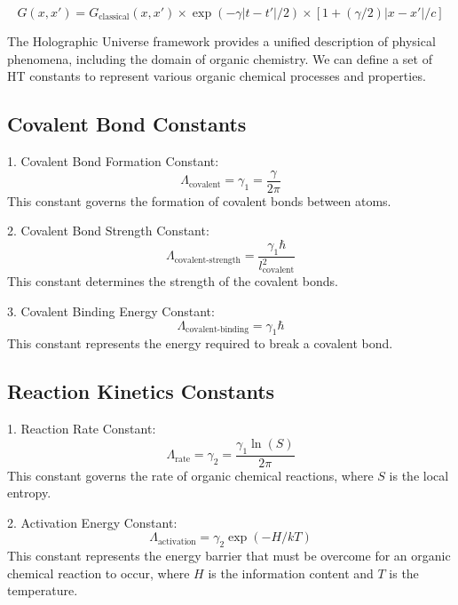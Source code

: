 \documentclass{article}
\theoremstyle{plain}
\theoremstyle{definition}
\theoremstyle{remark}
\begin{document}
\begin{equation}
G(x,x') = G_\text{classical}(x,x') \times \exp(-\gamma|t-t'|/2) \times \left[1 + (\gamma/2)|x-x'|/c\right]
\end{equation}

The Holographic Universe framework provides a unified description of physical phenomena, including the domain of organic chemistry. We can define a set of HT constants to represent various organic chemical processes and properties.

\subsection{Covalent Bond Constants}

1. Covalent Bond Formation Constant:
   \begin{equation}
   \Lambda_\text{covalent} = \gamma_1 = \frac{\gamma}{2\pi}
   \end{equation}
   This constant governs the formation of covalent bonds between atoms.

2. Covalent Bond Strength Constant:
   \begin{equation}
   \Lambda_\text{covalent-strength} = \frac{\gamma_1\hbar}{l_\text{covalent}^2}
   \end{equation}
   This constant determines the strength of the covalent bonds.

3. Covalent Binding Energy Constant:
   \begin{equation}
   \Lambda_\text{covalent-binding} = \gamma_1\hbar
   \end{equation}
   This constant represents the energy required to break a covalent bond.

\subsection{Reaction Kinetics Constants}

1. Reaction Rate Constant:
   \begin{equation}
   \Lambda_\text{rate} = \gamma_2 = \frac{\gamma_1\ln(S)}{2\pi}
   \end{equation}
   This constant governs the rate of organic chemical reactions, where $S$ is the local entropy.

2. Activation Energy Constant:
   \begin{equation}
   \Lambda_\text{activation} = \gamma_2\exp(-H/kT)
   \end{equation}
   This constant represents the energy barrier that must be overcome for an organic chemical reaction to occur, where $H$ is the information content and $T$ is the temperature.
\end{document}

